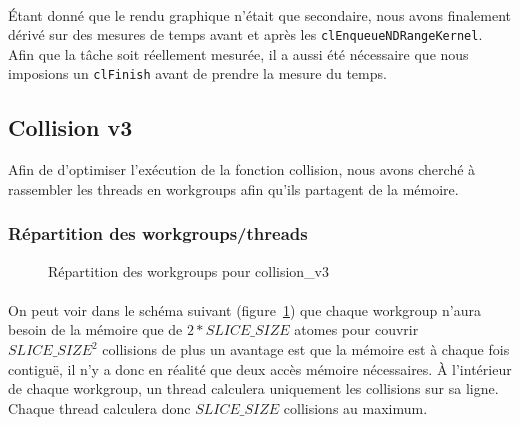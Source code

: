 \documentclass{article}
\begin{document}
\paragraph{}
Étant donné que le rendu graphique n'était que secondaire, nous avons finalement
dérivé sur des mesures de temps avant et après les
\verb!clEnqueueNDRangeKernel!. Afin que la tâche soit réellement mesurée, il
a aussi été nécessaire que nous imposions un \verb!clFinish! avant de prendre
la mesure du temps.

\subsection{Collision v3}
Afin de d'optimiser l'exécution de la fonction collision, nous avons cherché à
rassembler les threads en workgroups afin qu'ils partagent de la mémoire.

\subsubsection{Répartition des workgroups/threads}
\begin{figure}
  \caption{Répartition des workgroups pour collision\_v3}
  \label{collision-v3}
\end{figure}
\paragraph{}
On peut voir dans le schéma suivant (figure~\ref{collision-v3})
que chaque workgroup n'aura besoin de la mémoire
que de $2 * SLICE\_SIZE$ atomes pour couvrir $SLICE\_SIZE^2$ collisions de plus
un avantage est que la mémoire est à chaque fois contiguë, il n'y a donc en
réalité que deux accès mémoire nécessaires. À l'intérieur de chaque workgroup,
un thread calculera uniquement les collisions sur sa ligne. Chaque thread
calculera donc $SLICE\_SIZE$ collisions au maximum.
\end{document}
